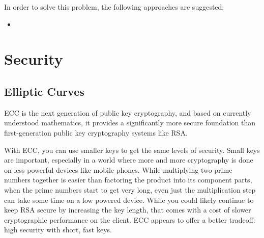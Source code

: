 In order to solve this problem, the following approaches are suggested:

\begin{itemize}
	\item 
\end{itemize}

\section{Security}
\subsection{Elliptic Curves}
ECC is the next generation of public key cryptography, and based on currently understood mathematics, it provides a significantly more secure foundation than first-generation public key cryptography systems like RSA.

With ECC, you can use smaller keys to get the same levels of security. Small keys are important, especially in a world where more and more cryptography is done on less powerful devices like mobile phones. While multiplying two prime numbers together is easier than factoring the product into its component parts, when the prime numbers start to get very long, even just the multiplication step can take some time on a low powered device. While you could likely continue to keep RSA secure by increasing the key length, that comes with a cost of slower cryptographic performance on the client. ECC appears to offer a better tradeoff: high security with short, fast keys.
